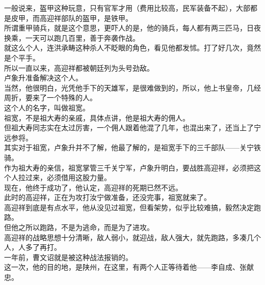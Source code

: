 \begin{multicols}{\theparacolNo}
一般说来，盔甲这种玩意，只有官军才用（费用比较高，民军装备不起），大部都是皮甲，而高迎祥部队的盔甲，是铁甲。\\

所谓重甲骑兵，就是这个意思，更吓人的是，他的骑兵，每人都有两三匹马，日夜换乘，一天可以跑几百里，善于奔袭作战。\\

就这么个人，连洪承畴这种杀人不眨眼的角色，看见他都发怵。打了好几次，竟然是个平手。\\

所以一直以来，高迎祥都被朝廷列为头号劲敌。\\

卢象升准备解决这个人。\\

当然，他很明白，光凭他手下的天雄军，是很难做到的，所以，他上书皇帝，几经周折，要来了一个特殊的人。\\

这个人的名字，叫做祖宽。\\

祖宽，不是祖大寿的亲戚，具体点讲，他是祖大寿的佣人。\\

但祖大寿同志实在太过厉害，一个佣人跟着他混了几年，也混出来了，还当上了宁远参将。\\

其实对于祖宽，卢象升并不了解，他最了解的，是祖宽手下的三千部队——关宁铁骑。\\

作为祖大寿的亲信，祖宽掌管三千关宁军，卢象升明白，要战胜高迎祥，必须把这个人拉过来，必须借用这股力量。\\

现在，他终于成功了，他认定，高迎祥的死期已然不远。\\

此时的高迎祥，正在为攻打汝宁做准备，还没完事，祖宽就来了。\\

高迎祥到底是有点水平，他从没见过祖宽，但看架势，似乎比较难搞，毅然决定跑路。\\

但他之所以跑路，不是为逃命，而是为了进攻。\\

高迎祥的战略思想十分清晰，敌人弱小，就迎战，敌人强大，就先跑路，多凑几个人，人多了再打。\\

一年前，曹文诏就是被这种战法报销的。\\

这一次，他的目的地，是陕州，在这里，有两个人正等待着他——李自成、张献忠。\\


\end{multicols}
